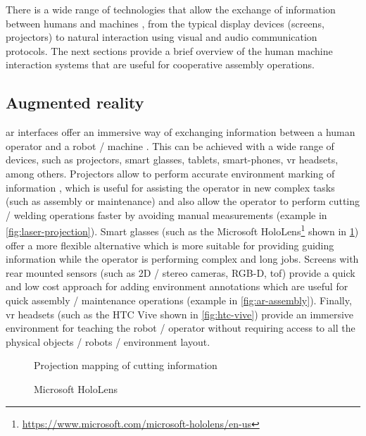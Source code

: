 There is a wide range of technologies that allow the exchange of information between humans and machines \cite{Goodrich2008}, from the typical display devices (screens, projectors) to natural interaction using visual and audio \cite{Yan2014} communication protocols. The next sections provide a brief overview of the human machine interaction systems that are useful for cooperative assembly operations.



\subsection{Augmented reality}

\gls{ar} interfaces \cite{Bimber2005} offer an immersive way of exchanging information between a human operator and a robot / machine \cite{Kollatsch2014,Gaschler2014,Dini2015,Michalos2016}. This can be achieved with a wide range of devices, such as projectors, smart glasses, tablets, smart-phones, \gls{vr} headsets, among others. Projectors allow to perform accurate environment marking of information \cite{Tan2013,Fujimoto2014}, which is useful for assisting the operator in new complex tasks (such as assembly or maintenance) and also allow the operator to perform cutting / welding operations faster by avoiding manual measurements (example in \cref{fig:laser-projection}). Smart glasses (such as the Microsoft HoloLens\footnote{\url{https://www.microsoft.com/microsoft-hololens/en-us}} shown in \cref{fig:hololens}) offer a more flexible alternative which is more suitable for providing guiding information while the operator is performing complex and long jobs. Screens with rear mounted sensors (such as 2D / stereo cameras, RGB-D, \gls{tof}) provide a quick and low cost approach for adding environment annotations which are useful for quick assembly / maintenance operations (example in \cref{fig:ar-assembly}). Finally, \gls{vr} headsets (such as the HTC Vive shown in \cref{fig:htc-vive}) provide an immersive environment for teaching the robot / operator without requiring access to all the physical objects / robots / environment layout.

\begin{figure}[H]
	\begin{floatrow}[2]
		{\caption[Projection mapping of cutting information]{Projection mapping of cutting information\protect\footnotemark}\label{fig:laser-projection}}
		{\caption[Microsoft HoloLens]{Microsoft HoloLens\protect\footnotemark}\label{fig:hololens}}
	\end{floatrow}
\end{figure}

